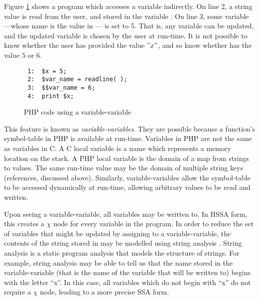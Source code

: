 Figure \ref{variable-variable} shows a program which accesses a
variable indirectly.
On line 2, a string value is read from the user, and stored in the
variable .  On line 3, some variable---whose name is the
value in  --- is set to 5.  That is, any variable can be
updated, and the updated variable is chosen by the user at run-time.
It is not possible to know whether the user has provided the value
$"x"$, and so know whether  has the value $5$ or $6$.

\begin{figure}[thp]
\begin{verbatim}
 1:  $x = 5;
 2:  $var_name = readline( );
 3:  $$var_name = 6;
 4:  print $x;
\end{verbatim}
\caption{PHP code using a variable-variable}
\label{variable-variable}
\end{figure}

This feature is known as \textit{variable-variables}.  They are
possible because a function's symbol-table in PHP is available at
run-time.  Variables in PHP are not the same as variables in C.  A C
local variable is a name which represents a memory location on the
stack.  A PHP local variable is the domain of a map from strings to
values.  The same run-time value may be the domain of multiple string
keys (references, discussed above).  Similarly, variable-variables
allow the symbol-table to be accessed dynamically at run-time,
allowing arbitrary values to be read and written.

Upon seeing a variable-variable, all variables may be written to.  In
HSSA form, this creates a $\chi$ node for every variable in the
program.  In order to reduce the set of variables that might be
updated by assigning to a variable-variable, the contents of the
string stored in  may be modelled using string analysis
\cite{Wassermann2007}.  String analysis is a static program analysis
that models the structure of strings.  For example, string analysis
may be able to tell us that the name stored in the variable-variable
(that is the name of the variable that will be written to) begins with
the letter ``x''.  In this case, all variables which do not begin with
``x'' do not require a $\chi$ node, leading to a more precise SSA form.

